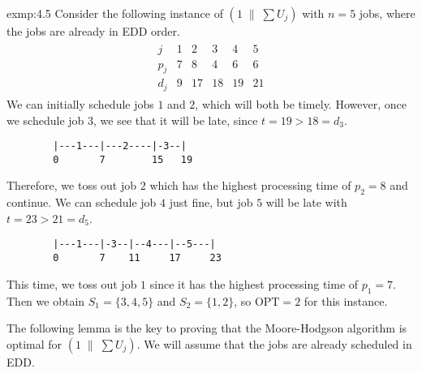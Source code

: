 \begin{exmp}{exmp:4.5}
    Consider the following instance of $(1 \;\|\; \sum U_j)$ with $n = 5$ jobs, 
    where the jobs are already in EDD order.  
    \begin{align*}
        \begin{array}{c|ccccc}
            j   & 1 & 2  & 3  & 4  & 5 \\ \hline 
            p_j & 7 & 8  & 4  & 6  & 6 \\ 
            d_j & 9 & 17 & 18 & 19 & 21
        \end{array}
    \end{align*}
    We can initially schedule jobs $1$ and $2$, which will both be timely. However, 
    once we schedule job $3$, we see that it will be late, since $t = 19 > 18 = d_3$.
    \begin{verbatim}
        |---1---|---2----|-3--|
        0       7        15   19
    \end{verbatim}
    \vspace{-1em}
    Therefore, we toss out job $2$ which has the highest processing time of $p_2 = 8$
    and continue. We can schedule job $4$ just fine, but job $5$ will be late with 
    $t = 23 > 21 = d_5$. 
    \begin{verbatim}
        |---1---|-3--|--4---|--5---|
        0       7    11     17     23
    \end{verbatim}
    \vspace{-1em}
    This time, we toss out job $1$ since it has the highest processing time of $p_1 = 7$. 
    Then we obtain $S_1 = \{3, 4, 5\}$ and $S_2 = \{1, 2\}$, so $\text{OPT} = 2$ for 
    this instance. 
\end{exmp}

The following lemma is the key to proving that the Moore-Hodgson algorithm is 
optimal for $(1\;\|\;\sum U_j)$. We will assume that the jobs are already scheduled 
in EDD. 

